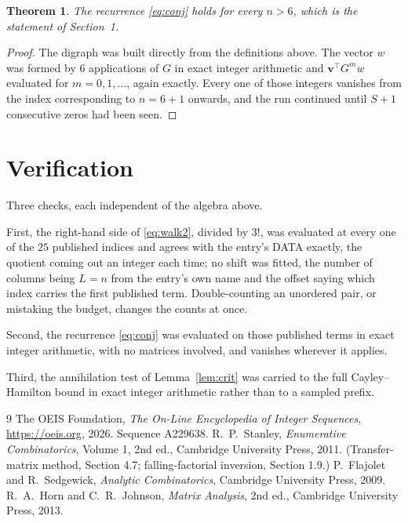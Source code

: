 \documentclass[11pt,a4paper]{article}
\theoremstyle{plain}
\newtheorem{theorem}{Theorem}
\theoremstyle{definition}
\begin{document}
\begin{theorem}
The recurrence \eqref{eq:conj} holds for every $n>6$, which is the statement of
Section~1.
\end{theorem}

\begin{proof}
The digraph was built directly from the definitions above. The vector $w$ was formed by
$6$ applications of $G$ in exact integer arithmetic and $\mathbf{v}^{\!\top}G^{m}w$
evaluated for $m=0,1,\dots$, again exactly. Every one of those integers vanishes from the
index corresponding to $n=6+1$ onwards, and the run continued until $S+1$ consecutive
zeros had been seen.
\end{proof}

\section{Verification}

Three checks, each independent of the algebra above.

First, the right-hand side of \eqref{eq:walk2}, divided by $3!$, was evaluated at every
one of the $25$ published indices and agrees with the entry's DATA exactly, the quotient
coming out an integer each time; no shift was fitted, the number of columns being $L=n$
from the entry's own name and the offset saying which index carries the first published term.
Double-counting an unordered pair, or mistaking the budget, changes the counts at once.

Second, the recurrence \eqref{eq:conj} was evaluated on those published terms in exact
integer arithmetic, with no matrices involved, and vanishes wherever it applies.

Third, the annihilation test of Lemma~\ref{lem:crit} was carried to the full
Cayley--Hamilton bound in exact integer arithmetic rather than to a sampled prefix.

\begin{thebibliography}{9}
 The OEIS Foundation, \emph{The On-Line Encyclopedia of Integer
Sequences}, \url{https://oeis.org}, 2026. Sequence A229638.
 R.~P.~Stanley, \emph{Enumerative Combinatorics}, Volume 1, 2nd ed.,
Cambridge University Press, 2011. (Transfer-matrix method, Section 4.7; falling-factorial
inversion, Section 1.9.)
 P.~Flajolet and R.~Sedgewick, \emph{Analytic Combinatorics}, Cambridge
University Press, 2009.
 R.~A.~Horn and C.~R.~Johnson, \emph{Matrix Analysis}, 2nd ed., Cambridge
University Press, 2013.
\end{thebibliography}
\end{document}
